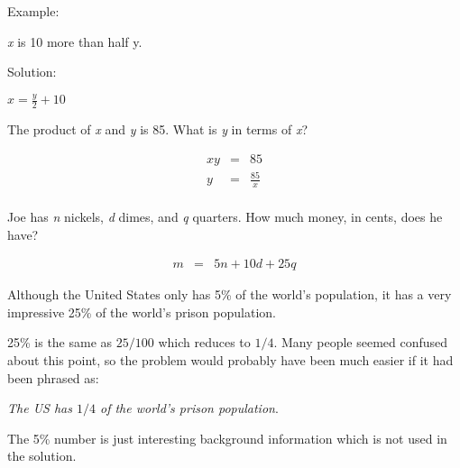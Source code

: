 \documentclass[fleqn,addpoints]{exam}
\begin{document}
\begin{questions}
Example:

\hspace{1 cm} {\em x} is 10 more than half {y}.

Solution:

\hspace{1 cm} \(\displaystyle x = \frac{y}{2} + 10 \)

\vspace{1 cm}

\question[5] \label{eae:first}
The product of {\em x} and {\em y} is 85.  What is {\em y} in terms of {\em x}?

\begin{solution}[3 cm]
  \begin{eqnarray*}
      xy & = & 85 \\
      y  & = & \frac{85}{x} \\
  \end{eqnarray*}
\end{solution}

\question[5] 
Joe has {\em n} nickels, {\em d} dimes, and {\em q} quarters.  How much money, in cents, does he have?

\begin{solution}[3 cm]
  \begin{eqnarray*}
      m & = & 5n + 10d + 25q 
  \end{eqnarray*}
\end{solution}


\question \label{eae:last} 
Although the United States only has 5\% of the world's population, it has a very impressive 25\% of the world's prison
population.

\ifprintanswers
  \begin{em}
  25\% is the same as \( 25/100 \) which reduces to \( 1/4 \).  Many people seemed confused about this point, so the
  problem would probably have been much easier if it had been phrased as:  

  {\em The US has \( 1/4 \) of the world's prison population}.

  The 5\% number is just interesting background information which is not used in the solution.

  \end{em}
\fi

\end{questions}
\end{document}
